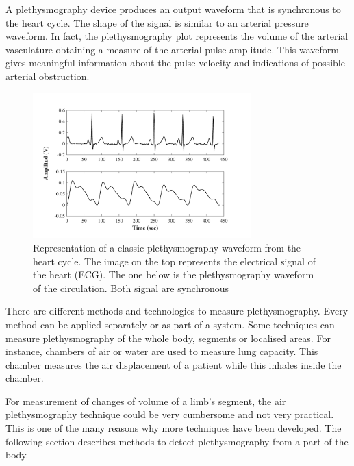 A plethysmography device produces an output waveform that is synchronous to the heart cycle. The shape of the signal is similar to an arterial pressure waveform. In fact, the plethysmography plot represents the volume of the arterial vasculature obtaining a measure of the arterial pulse amplitude. This waveform gives meaningful information about the pulse velocity and indications of possible arterial obstruction.

\begin{figure}[!htpb]
	\centering
	\includegraphics[width=0.75\textwidth,keepaspectratio]{figure3}    
	\caption[Classic plethysmography waveform]{Representation of a classic plethysmography waveform from the heart cycle. The image on the top represents the electrical signal of the heart (ECG). The one below is the plethysmography waveform of the circulation. Both signal are synchronous}
	\label{fig:plethysmography}
\end{figure}

There are different methods and technologies to measure plethysmography. Every method can be applied separately or as part of a system. Some techniques can measure plethysmography of the whole body, segments or localised areas. For instance, chambers of air or water are used to measure lung capacity. This chamber measures the air displacement of a patient while this inhales inside the chamber. 

For measurement of changes of volume of a limb's segment, the air plethysmography technique could be very cumbersome and not very practical. This is one of the many reasons why more techniques have been developed. The following section describes methods to detect plethysmography from a part of the body.

